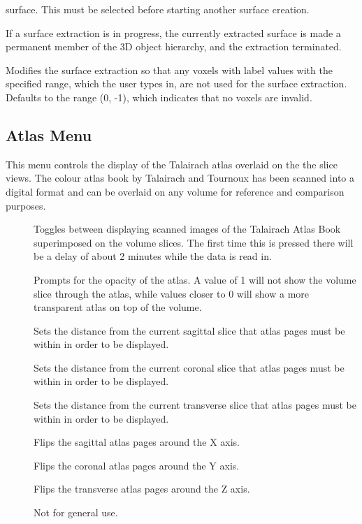 \begin{description}
    surface.  This must be selected before starting
    another surface creation.
\item[\menutwo{Create Surface}{Make Permanent}]  If a surface extraction
    is in progress, the currently extracted surface is made a permanent
    member of the 3D object hierarchy, and the extraction terminated.
\item[\menutwo{Create Surface}{Set Invalid Lbl Range}]  Modifies the surface
    extraction so that any voxels with label values with the specified range,
    which the user types in, are not used for the surface extraction.
    Defaults to the range (0, -1), which indicates that no voxels are invalid.
\end{description}

\subsection{Atlas Menu}

This menu controls the display of the Talairach atlas overlaid on the
the slice views.  The colour atlas book by Talairach and Tournoux
has been scanned into a digital
format and can be overlaid on any volume for reference and comparison
purposes.

\begin{description}
\item[]  Toggles between displaying scanned images
        of the Talairach Atlas Book superimposed on the volume slices.  The
        first time this is pressed there will be a delay of about 2 minutes
        while the data is read in.
\item[]  Prompts for the opacity of the atlas.
        A value of 1 will not show the volume slice through the atlas, while
        values closer to 0 will show a more transparent atlas on top of the
        volume.
\item[]  Sets the distance from the current
        sagittal slice that atlas pages must be within in order to be
        displayed.
\item[]  Sets the distance from the current
        coronal slice that atlas pages must be within in order to be
        displayed.
\item[]  Sets the distance from the current
        transverse slice that atlas pages must be within in order to be
        displayed.
\item[]  Flips the sagittal atlas pages around the X axis.
\item[]  Flips the coronal atlas pages around the Y axis.
\item[]  Flips the transverse atlas pages around the Z axis.
\item[]  Not for general use.
\end{description}

